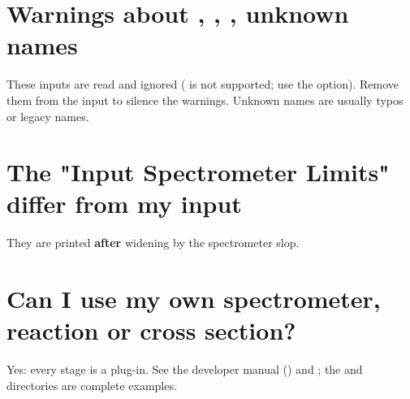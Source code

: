 \section*{\texorpdfstring{Warnings about , , , unknown names}{Warnings about pt\_\allowbreak{}b\_\allowbreak{}param,\allowbreak{} sigc\_*, random\_\allowbreak{}state\_\allowbreak{}file,\allowbreak{} unknown names}}\label{user_manual-10u5ffaq:warnings-about-ptu5fbu5fparam-sigcu5f-randomu5fstateu5ffile-unknown-names}
These inputs are read and ignored (\hyperref[param:randomu5fstateu5ffile]{} is not supported; use the   option). Remove them from the
input to silence the warnings. Unknown names are usually typos or legacy names.

\section*{\texorpdfstring{The  "Input Spectrometer Limits" differ from my input}{The .hist "Input Spectrometer Limits" differ from my input}}\label{user_manual-10u5ffaq:the-hist-input-spectrometer-limits-differ-from-my-input}
They are printed \textbf{after} widening by the spectrometer slop.

\section*{\texorpdfstring{Can I use my own spectrometer,\allowbreak{} reaction or cross section?}{Can I use my own spectrometer,\allowbreak{} reaction or cross section?}}\label{user_manual-10u5ffaq:can-i-use-my-own-spectrometer-reaction-or-cross-section}
Yes: every stage is a plug-in. See the developer manual () and ; the
 and  directories are complete examples.

